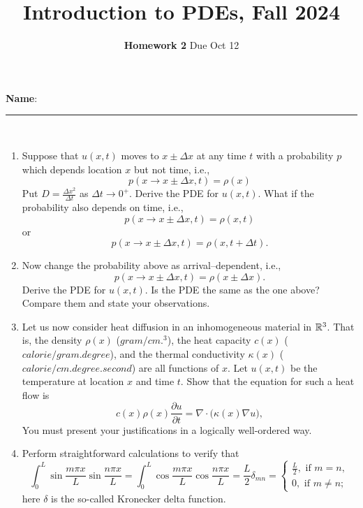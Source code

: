 \documentclass[6pt]{article}
\title{Introduction to PDEs, Fall 2024}
\author{\textbf{Homework 2} Due Oct 12}
\date{}
\numberwithin{equation}{section}
\def\mathbb{\Bbb}
\begin{document}
\maketitle

\textbf{Name}:\rule{1 in}{0.001 in} \\
\begin{enumerate}

\item Suppose that $u(x,t)$ moves to $x\pm\Delta x$  at any time $t$ with a probability $p$ which depends location $x$ but not time, i.e.,
\[p(x\rightarrow x\pm\Delta x,t)=\rho(x)\]
Put $D=\frac{\Delta x^2}{\Delta t}$ as $\Delta t \rightarrow 0^+$.  Derive the PDE for $u(x,t)$.  What if the probability also depends on time, i.e.,
\[p(x\rightarrow x\pm\Delta x,t)=\rho(x,t)\]
or
\[p(x\rightarrow x\pm\Delta x,t)=\rho(x,t+\Delta t).\]


\item  Now change the probability above as arrival--dependent, i.e.,
\[p(x\rightarrow x\pm\Delta x,t)=\rho(x\pm\Delta x).\]
Derive the PDE for $u(x,t)$.  Is the PDE the same as the one above?  Compare them and state your observations.

\item  Let us now consider heat diffusion in an inhomogeneous material in $\mathbb R^3$.  That is, the density $\rho(x)$ ($gram/cm.^3$), the heat capacity $c(x)$ ($calorie/gram.degree$), and the thermal conductivity $\kappa(x)$ ($calorie/cm.degree.second$) are all functions of $x$.  Let $u(x,t)$ be the temperature at location $x$ and time $t$.  Show that the equation for such a heat flow is
\begin{equation}\label{1}
c(x)\rho(x) \frac{\partial u}{\partial t}=\nabla \cdot\big (\kappa(x) \nabla u\big),
\end{equation}
You must present your justifications in a logically well-ordered way.   

\item
Perform straightforward calculations to verify that
\begin{equation*}
\int_0^L \sin \frac{m\pi x}{L} \sin \frac{n\pi x}{L}=\int_0^L \cos \frac{m\pi x}{L} \cos \frac{n\pi x}{L}=\frac{L}{2}\delta_{mn}=
\left\{
\begin{array}{ll}
\frac{L}{2},\text{~if~}m=n,\\
0,\text{~if~}m\neq n;
\end{array}
\right.
\end{equation*}
here $\delta$ is the so-called Kronecker delta function.



\end{enumerate}
\end{document}
